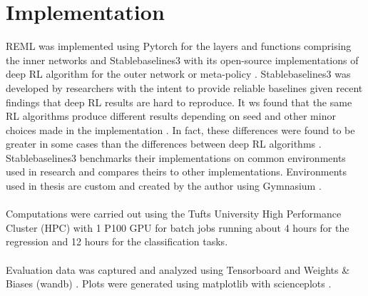 \section{Implementation}
REML was implemented using Pytorch for the layers and functions comprising the 
inner networks and Stablebaselines3 with its open-source implementations of deep RL 
algorithm for the outer network or meta-policy \cite{pytorch, RafHilGleKanErnDor:21}. 
Stablebaselines3 was developed by researchers with the intent to 
provide reliable baselines given recent findings that deep RL results are hard to 
reproduce. It ws found that the same RL algorithms produce different results depending 
on seed and other minor choices made in the implementation \cite{HenIslBacPinPreMeg:18}. 
In fact, these differences were found to be greater in some cases than the differences between
deep RL algorithms \cite{EngIlySanTsi:20}. Stablebaselines3 benchmarks their implementations
on common environments used in research and compares theirs to other implementations. 
Environments used in thesis are custom and created by the author using Gymnasium \cite{gymnasium}.
\\\\
Computations were carried out using the Tufts University High Performance Cluster (HPC) 
with 1 P100 GPU for batch jobs running about 4 hours for the regression and 12
hours for the classification tasks.
\\\\
Evaluation data was captured and analyzed using Tensorboard and Weights \& Biases (wandb)
\cite{tensorflow2015-whitepaper, wandb}. Plots were generated using matplotlib with 
scienceplots \cite{mmatplotlib SciencePlots}.


